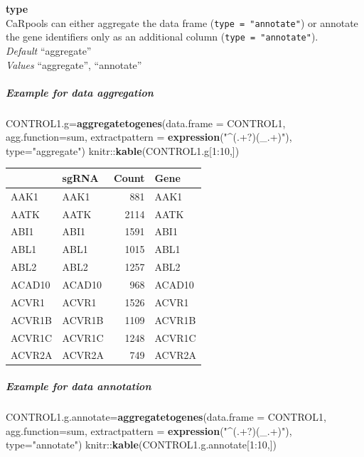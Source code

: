 \documentclass[]{article}
\newenvironment{Shaded}{\begin{snugshade}}{\end{snugshade}}
\newcommand{\KeywordTok}[1]{\textcolor[rgb]{0.13,0.29,0.53}{\textbf{{#1}}}}
\newcommand{\DataTypeTok}[1]{\textcolor[rgb]{0.13,0.29,0.53}{{#1}}}
\newcommand{\DecValTok}[1]{\textcolor[rgb]{0.00,0.00,0.81}{{#1}}}
\newcommand{\StringTok}[1]{\textcolor[rgb]{0.31,0.60,0.02}{{#1}}}
\newcommand{\NormalTok}[1]{{#1}}
\let\oldsubparagraph\subparagraph
\renewcommand{\subparagraph}[1]{\oldsubparagraph{#1}\mbox{}}
\begin{document}
\textbf{type}\\
CaRpools can either aggregate the data frame
(\texttt{type\ =\ "annotate"}) or annotate the gene identifiers only as
an additional column (\texttt{type\ =\ "annotate"}).\\
\emph{Default} ``aggregate''\\
\emph{Values} ``aggregate'', ``annotate''

\subparagraph{Example for data
aggregation}\label{example-for-data-aggregation}

\begin{Shaded}
\begin{Highlighting}[]
\NormalTok{CONTROL1.g=}\KeywordTok{aggregatetogenes}\NormalTok{(}\DataTypeTok{data.frame =} \NormalTok{CONTROL1, }\DataTypeTok{agg.function=}\NormalTok{sum,}
            \DataTypeTok{extractpattern =} \KeywordTok{expression}\NormalTok{(}\StringTok{"^(.+?)(_.+)"}\NormalTok{), }\DataTypeTok{type=}\StringTok{"aggregate"}\NormalTok{)}
\NormalTok{knitr::}\KeywordTok{kable}\NormalTok{(CONTROL1.g[}\DecValTok{1}\NormalTok{:}\DecValTok{10}\NormalTok{,])}
\end{Highlighting}
\end{Shaded}

\begin{longtable}[c]{@{}llrl@{}}
\toprule
& sgRNA & Count & Gene\tabularnewline
\midrule
\endhead
AAK1 & AAK1 & 881 & AAK1\tabularnewline
AATK & AATK & 2114 & AATK\tabularnewline
ABI1 & ABI1 & 1591 & ABI1\tabularnewline
ABL1 & ABL1 & 1015 & ABL1\tabularnewline
ABL2 & ABL2 & 1257 & ABL2\tabularnewline
ACAD10 & ACAD10 & 968 & ACAD10\tabularnewline
ACVR1 & ACVR1 & 1526 & ACVR1\tabularnewline
ACVR1B & ACVR1B & 1109 & ACVR1B\tabularnewline
ACVR1C & ACVR1C & 1248 & ACVR1C\tabularnewline
ACVR2A & ACVR2A & 749 & ACVR2A\tabularnewline
\bottomrule
\end{longtable}

\subparagraph{Example for data
annotation}\label{example-for-data-annotation}

\begin{Shaded}
\begin{Highlighting}[]
\NormalTok{CONTROL1.g.annotate=}\KeywordTok{aggregatetogenes}\NormalTok{(}\DataTypeTok{data.frame =} \NormalTok{CONTROL1, }\DataTypeTok{agg.function=}\NormalTok{sum,}
            \DataTypeTok{extractpattern =} \KeywordTok{expression}\NormalTok{(}\StringTok{"^(.+?)(_.+)"}\NormalTok{), }\DataTypeTok{type=}\StringTok{"annotate"}\NormalTok{)}
\NormalTok{knitr::}\KeywordTok{kable}\NormalTok{(CONTROL1.g.annotate[}\DecValTok{1}\NormalTok{:}\DecValTok{10}\NormalTok{,])}
\end{Highlighting}
\end{Shaded}
\end{document}
